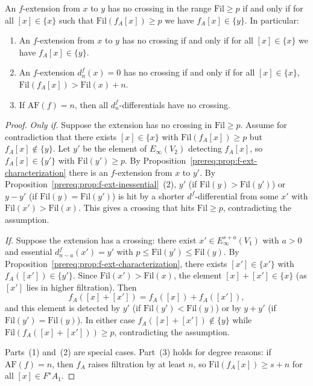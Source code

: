 \begin{proposition}\label{prereq:prop:no-crossing-iff}
    \leanok
    An $f$-extension from $x$ to $y$ has no crossing in the range $\mathrm{Fil} \ge p$ if and only if for all $[x] \in \{x\}$ such that $\mathrm{Fil}(f_A[x]) \ge p$ we have $f_A[x] \in \{y\}$. In particular:
    \begin{enumerate}
        \item An $f$-extension from $x$ to $y$ has no crossing if and only if for all $[x] \in \{x\}$ we have $f_A[x] \in \{y\}$.
        \item An $f$-extension $d_n^f(x) = 0$ has no crossing if and only if for all $[x] \in \{x\}$, $\mathrm{Fil}(f_A[x]) > \mathrm{Fil}(x) + n$.
        \item If $\mathrm{AF}(f) = n$, then all $d_n^f$-differentials have no crossing.
    \end{enumerate}
\end{proposition}
\begin{proof}
    \emph{Only if.} Suppose the extension has no crossing in $\mathrm{Fil} \ge p$. Assume for contradiction that there exists $[x] \in \{x\}$ with $\mathrm{Fil}(f_A[x]) \ge p$ but $f_A[x] \notin \{y\}$. Let $y'$ be the element of $E_\infty(V_2)$ detecting $f_A[x]$, so $f_A[x] \in \{y'\}$ with $\mathrm{Fil}(y') \ge p$. By Proposition~\ref{prereq:prop:f-ext-characterization} there is an $f$-extension from $x$ to $y'$. By Proposition~\ref{prereq:prop:f-ext-inessential}~(2), $y'$ (if $\mathrm{Fil}(y) > \mathrm{Fil}(y')$) or $y - y'$ (if $\mathrm{Fil}(y) = \mathrm{Fil}(y')$) is hit by a shorter $d^f$-differential from some $x'$ with $\mathrm{Fil}(x') > \mathrm{Fil}(x)$. This gives a crossing that hits $\mathrm{Fil} \ge p$, contradicting the assumption.

    \emph{If.} Suppose the extension has a crossing: there exist $x' \in E_\infty^{s+a}(V_1)$ with $a > 0$ and essential $d_{n-a}^f(x') = y'$ with $p \le \mathrm{Fil}(y') \le \mathrm{Fil}(y)$. By Proposition~\ref{prereq:prop:f-ext-characterization}, there exists $[x'] \in \{x'\}$ with $f_A([x']) \in \{y'\}$. Since $\mathrm{Fil}(x') > \mathrm{Fil}(x)$, the element $[x] + [x'] \in \{x\}$ (as $[x']$ lies in higher filtration). Then
    $$f_A([x] + [x']) = f_A([x]) + f_A([x']),$$
    and this element is detected by $y'$ (if $\mathrm{Fil}(y') < \mathrm{Fil}(y)$) or by $y + y'$ (if $\mathrm{Fil}(y') = \mathrm{Fil}(y)$). In either case $f_A([x] + [x']) \notin \{y\}$ while $\mathrm{Fil}(f_A([x] + [x'])) \ge p$, contradicting the assumption.

    Parts~(1) and~(2) are special cases. Part~(3) holds for degree reasons: if $\mathrm{AF}(f) = n$, then $f_A$ raises filtration by at least $n$, so $\mathrm{Fil}(f_A[x]) \ge s + n$ for all $[x] \in F^s A_1$.
\end{proof}

